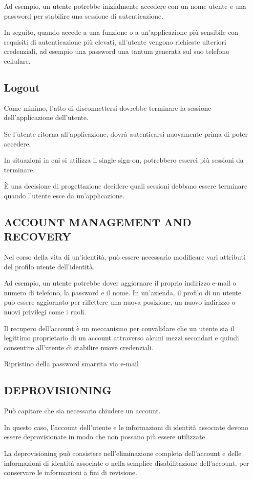 Ad esempio, un utente potrebbe inizialmente accedere con un nome utente e una password per stabilire una sessione di autenticazione.

In seguito, quando accede a una funzione o a un'applicazione più sensibile con requisiti di autenticazione più elevati, all'utente vengono richieste ulteriori credenziali, ad esempio una password una tantum generata sul suo telefono cellulare. 


\subsection{Logout}
Come minimo, l'atto di disconnettersi dovrebbe terminare la sessione dell'applicazione dell'utente.

Se l'utente ritorna all'applicazione, dovrà autenticarsi nuovamente prima di poter accedere.

In situazioni in cui si utilizza il single sign-on, potrebbero esserci più sessioni da terminare.

È una decisione di progettazione decidere quali sessioni debbano essere terminare quando l'utente esce da un'applicazione. 

\subsection{ACCOUNT MANAGEMENT AND RECOVERY}

Nel corso della vita di un'identità, può essere necessario modificare vari attributi del profilo utente dell'identità.

Ad esempio, un utente potrebbe dover aggiornare il proprio indirizzo e-mail o numero di telefono, la password e il nome.
In un'azienda, il profilo di un utente può essere aggiornato per riflettere una nuova posizione, un nuovo indirizzo o nuovi privilegi come i ruoli. 

Il recupero dell'account è un meccanismo per convalidare che un utente sia il legittimo proprietario di un account attraverso alcuni mezzi secondari e quindi consentire all'utente di stabilire nuove credenziali.

Ripristino della password smarrita via e-mail

\subsection{DEPROVISIONING}

Può capitare che sia necessario chiudere un account.

In questo caso, l'account dell'utente e le informazioni di identità associate devono essere deprovisionate in modo che non possano più essere utilizzate.

La deprovisioning può consistere nell'eliminazione completa dell'account e delle informazioni di identità associate o nella semplice disabilitazione dell'account, per conservare le informazioni a fini di revisione.